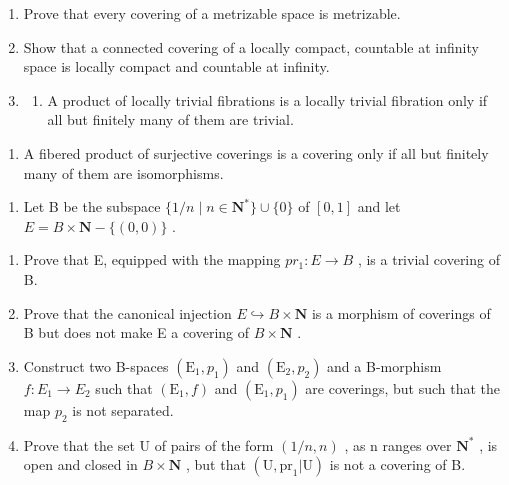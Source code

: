 \exercisegroup

\begin{enumerate}
\def\labelenumi{\arabic{enumi})}
\item
  Prove that every covering of a metrizable space is metrizable.
\item
  Show that a connected covering of a locally compact, countable at infinity space is locally compact and countable at infinity.
\item
  \begin{enumerate}
  \def\labelenumii{\alph{enumii})}
  \tightlist
  \item
    A product of locally trivial fibrations is a locally trivial fibration only if all but finitely many of them are trivial.
  \end{enumerate}
\end{enumerate}

\begin{enumerate}
\def\labelenumi{\alph{enumi})}
\setcounter{enumi}{1}
\tightlist
\item
  A fibered product of surjective coverings is a covering only if all but finitely many of them are isomorphisms.
\end{enumerate}

\begin{enumerate}
\def\labelenumi{\arabic{enumi})}
\setcounter{enumi}{3}
\tightlist
\item
  Let B be the subspace \(\{1/n \mid n \in \mathbf{N}^*\} \cup \{0\}\) of \([0,1]\) and let \(E = B \times \mathbf{N} - \{(0,0)\}\) .
\end{enumerate}

\begin{enumerate}
\def\labelenumi{\alph{enumi})}
\item
  Prove that E, equipped with the mapping \(pr_{1}: E \to B\) , is a trivial covering of B.
\item
  Prove that the canonical injection \(E \hookrightarrow B \times \mathbf{N}\) is a morphism of coverings of B but does not make E a covering of \(B \times \mathbf{N}\) .
\item
  Construct two B-spaces \((\mathrm{E}_{1}, p_{1})\) and \((\mathrm{E}_{2}, p_{2})\) and a B-morphism \(f: E_{1} \to E_{2}\) such that \((\mathrm{E}_{1}, f)\) and \((\mathrm{E}_{1}, p_{1})\) are coverings, but such that the map \(p_{2}\) is not separated.
\item
  Prove that the set U of pairs of the form \((1/n,n)\) , as n ranges over \(\mathbf{N}^{*}\) , is open and closed in \(B \times \mathbf{N}\) , but that \((\mathrm{U},\mathrm{pr}_{1}|\mathrm{U})\) is not a covering of B.
\end{enumerate}

